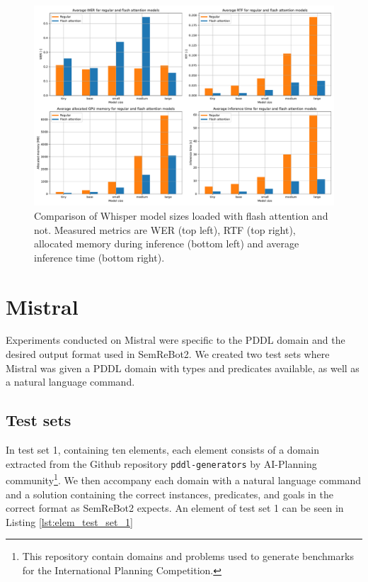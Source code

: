 \begin{figure}[ht]
    \centering
    \includegraphics[width=\textwidth]{figures/avg.pdf}
    \caption[Whisper experiment results]{Comparison of Whisper model sizes loaded with flash attention and not. Measured metrics are WER (top left), RTF (top right), allocated memory during inference (bottom left) and average inference time (bottom right).}
    \label{fig:whisper_avg}
\end{figure}

\section{Mistral}\label{sec:Mistral_experiments}
Experiments conducted on Mistral were specific to the PDDL domain and the desired output format used in SemReBot2. We created two test sets where Mistral was given a PDDL domain with types and predicates available, as well as a natural language command.

\subsection{Test sets}
In test set 1, containing ten elements, each element consists of a domain extracted from the Github repository \verb|pddl-generators| by AI-Planning community\cite{favorito_ai-planningpddl-generators_2024}\footnote{This repository contain domains and problems used to generate benchmarks for the International Planning Competition.}. We then accompany each domain with a natural language command and a solution containing the correct instances, predicates, and goals in the correct format as SemReBot2 expects. An element of test set 1 can be seen in Listing \ref{lst:elem_test_set_1}


